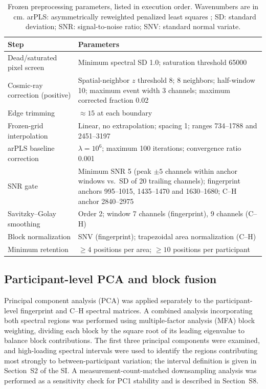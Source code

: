 \documentclass[preprint,12pt]{elsarticle}
\begin{document}
\begin{table}[ht]
\centering
\caption{Frozen preprocessing parameters, listed in execution order. Wavenumbers are in \si{\per\centi\metre}. arPLS: asymmetrically reweighted penalized least squares \cite{baek2015}; SD: standard deviation; SNR: signal-to-noise ratio; SNV: standard normal variate.}
\label{tab:preprocessing_params}
\scriptsize
\setlength{\tabcolsep}{5pt}
\renewcommand{\arraystretch}{1.15}
\begin{tabularx}{\textwidth}{@{}l>{\raggedright\arraybackslash}X@{}}
\toprule
Step & Parameters \\
\midrule
Dead/saturated pixel screen      & Minimum spectral SD 1.0; saturation threshold \num{65000} \\
Cosmic-ray correction (positive) & Spatial-neighbor $z$ threshold 8; 8 neighbors; half-window 10; maximum event width 3 channels; maximum corrected fraction 0.02 \\
Edge trimming                    & ${\approx}15$ at each boundary \\
Frozen-grid interpolation        & Linear, no extrapolation; spacing 1; ranges 734--1788 and 2451--3197 \\
arPLS baseline correction        & $\lambda = 10^{6}$; maximum 100 iterations; convergence ratio 0.001 \\
SNR gate                         & Minimum SNR 5 (peak $\pm 5$ channels within anchor windows vs.\ SD of 20 trailing channels); fingerprint anchors 995--1015, 1435--1470 and 1630--1680; C--H anchor 2840--2975 \\
Savitzky--Golay smoothing        & Order 2; window 7 channels (fingerprint), 9 channels (C--H) \\
Block normalization              & SNV (fingerprint); trapezoidal area normalization (C--H) \\
Minimum retention                & ${\geq}4$ positions per area; ${\geq}10$ positions per participant \\
\bottomrule
\end{tabularx}
\end{table}

\subsection{Participant-level PCA and block fusion} 
\label{subsec:biopca}

Principal component analysis (PCA) was applied separately to the participant-level fingerprint and C--H spectral matrices. A combined analysis incorporating both spectral regions was performed using multiple-factor analysis (MFA) block weighting, dividing each block by the square root of its leading eigenvalue to balance block contributions. The first three principal components were examined, and high-loading spectral intervals were used to identify the regions contributing most strongly to between-participant variation; the interval definition is given in Section~S2 of the SI. A measurement-count-matched downsampling analysis was performed as a sensitivity check for PC1 stability and is described in Section~S8.
\end{document}
